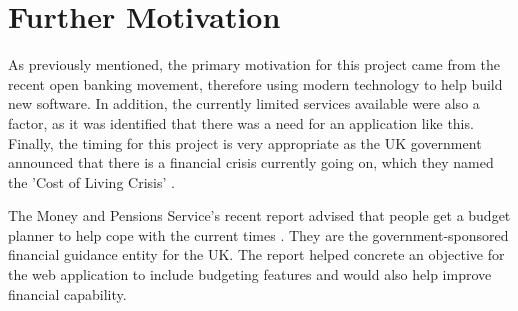 \section{Further Motivation}
\label{sec:further-motivation}
As previously mentioned, the primary motivation for this project came from the recent open banking movement, therefore using modern technology to help build new software. In addition, the currently limited services available were also a factor, as it was identified that there was a need for an application like this. Finally, the timing for this project is very appropriate as the UK government announced that there is a financial crisis currently going on, which they named the 'Cost of Living Crisis' \cite{CostOfLivingCrisisGov}.

The Money and Pensions Service's recent report advised that people get a budget planner to help cope with the current times \cite{MaPS}. They are the government-sponsored financial guidance entity for the UK. The report helped concrete an objective for the web application to include budgeting features and would also help improve financial capability.